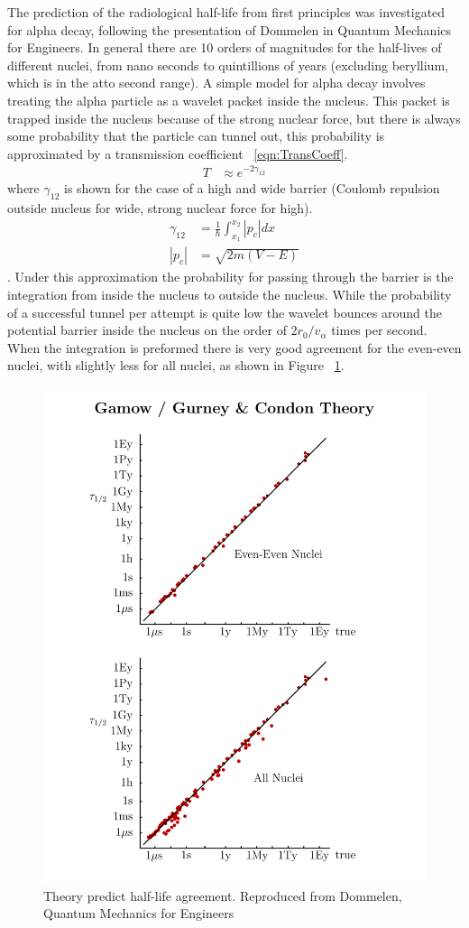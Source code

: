 \documentclass[11pt]{article}
\begin{document}
The prediction of the radiological half-life from first principles was investigated for alpha decay, following the presentation of Dommelen in Quantum Mechanics for Engineers. 
In general there are 10 orders of magnitudes for the half-lives of different nuclei, from nano seconds to quintillions of years (excluding beryllium, which is in the atto second range).
A simple model for alpha decay involves treating the alpha particle as a wavelet packet inside the nucleus.
This packet is trapped inside the nucleus because of the strong nuclear force, but there is always some probability that the particle can tunnel out, this probability is approximated by a transmission coefficient ~\ref{eqn:TransCoeff}.
\begin{align}
	T &\approx e^{-2\gamma_{12}}
	\label{eqn:TransCoeff}
\end{align}
where $\gamma_{12}$ is shown for the case of a high and wide barrier (Coulomb repulsion outside nucleus for wide, strong nuclear force for high).
\begin{align}
	\gamma_{12} &= \frac{1}{\hbar} \int_{x_1}^{x_2} \left | p_c \right | dx \\
	\left | p_c \right | &= \sqrt{2m(V-E)}
\end{align}.
Under this approximation the probability for passing through the barrier is the integration from inside the nucleus to outside the nucleus.
While the probability of a successful tunnel per attempt is quite low the wavelet  bounces around the potential barrier inside the nucleus on the order of $2r_0/v_\alpha$ times per second.
When the integration is preformed there is very good agreement for the even-even nuclei, with slightly less for all nuclei, as shown in Figure ~\ref{fig:AlphaDecayAgreement}.
\begin{figure}[ht]
	\centering
	\includegraphics[width=\textwidth]{Gamow_GurneyCondonTheory.pdf}
	\caption{Theory predict half-life agreement.  Reproduced from Dommelen, Quantum Mechanics for Engineers}
	\label{fig:AlphaDecayAgreement}
\end{figure}
\end{document}
